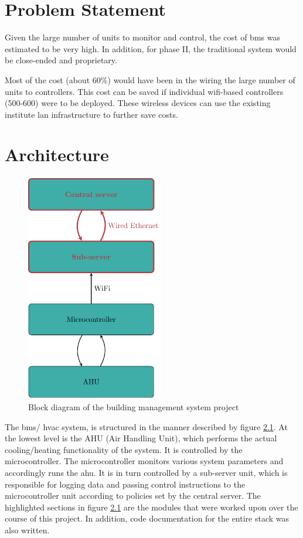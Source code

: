 \documentclass[letterpaper,11pt]{report}
\begin{document}
\newpage
\chapter{Problem Statement}\label{chapter:problemstatement}
\onehalfspacing
Given the large number of units to monitor and control, the cost of \ac{bms} was estimated to be very high. In addition, for phase II, the traditional system would be close-ended and proprietary.
\par
Most of the cost (about 60\%) would have been in the wiring the large number of units to controllers. This cost can be saved if individual \ac{wifi}-based controllers (500-600) were to be deployed. These wireless devices can use the existing institute \ac{lan} infrastructure to further save costs.

\newpage
\chapter{Architecture}\label{chapter:architecture}
\onehalfspacing
\begin{figure}[h]
\includegraphics[width=6cm, height=10cm]{arch}
\centering
\captionsetup{justification=centering}
\caption{Block diagram of the building management system project}
\label{fig:arch}
\end{figure}
The \ac{bms}/ \ac{hvac} system, is structured in the manner described by figure \ref{fig:arch}. At the lowest level is the AHU (Air Handling Unit), which performs the actual cooling/heating functionality of the system. It is controlled by the microcontroller. The microcontroller monitors various system parameters and accordingly runs the \ac{ahu}. It is in turn controlled by a sub-server unit, which is responsible for logging data and passing control instructions to the microcontroller unit according to policies set by the central server. The highlighted sections in figure \ref{fig:arch} are the modules that were worked upon over the course of this project. In addition, code documentation for the entire stack was also written.
\end{document}
